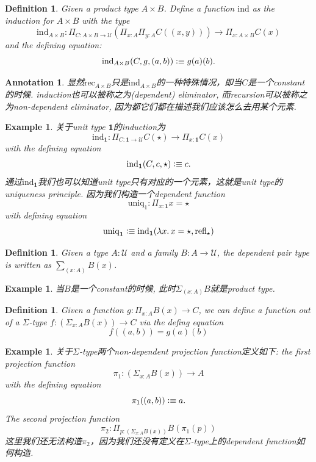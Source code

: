 \documentclass{article}
\newtheorem{example}[theorem]{Example}
\newtheorem{definition}[theorem]{Definition}
\newtheorem{annotation}[theorem]{Annotation}
\newcommand{\lam}[2]{\ensuremath{\lambda #1\ldotp #2}} %
\newcommand{\defeqv}{\vcentcolon\equiv}
\begin{document}
\begin{definition}
\rm Given a product type $A \times B$. Define a function $\text{ind}$ as the induction for $A \times B$ with the type
\[
	\text{ind}_{A \times B}: {\Pi}_{C:A \times B \to \mathcal{U}}(\Pi_{x:A}\Pi_{y:A} C((x,y))) \to \Pi_{x:A\times B} C(x)
\]
and the defining equation:
\[
	\text{ind}_{A \times B}(C, g, (a,b)) \defeqv g(a)(b).
\]
\end{definition}

\begin{annotation}
\rm 显然$\text{rec}_{A \times B}$只是$\text{ind}_{A \times B}$的一种特殊情况，即当$C$是一个constant的时候. induction也可以被称之为(dependent) eliminator, 而recursion可以被称之为non-dependent eliminator, 因为都它们都在描述我们应该怎么去用某个元素. 
\end{annotation}

\begin{example}
\rm 关于unit type $\mathbf{1}$的induction为
\[
    \text{ind}_\mathbf{1}: \Pi_{C:\mathbf{1} \to \mathcal{U}} C(\star) \to \Pi_{x:\mathbf{1}} C(x)
\]
with the defining equation
\[
    \text{ind}_\mathbf{1}(C,c,\star) \defeqv c.
\]
通过$\text{ind}_\mathbf{1}$我们也可以知道unit type只有对应的一个元素，这就是unit type的uniqueness principle. 因为我们构造一个dependent function
\[
    \text{uniq}_1:\Pi_{x:\mathbf{1}} x=\star
\]
with defining equation
\[
    \text{uniq}_\mathbf{1} \defeqv \text{ind}_\mathbf{1}(\lam{x}{x = \star}, \text{refl}_\star)
\]
\end{example}

\begin{definition}
\rm Given a type $A:\mathcal{U}$ and a family $B: A \to \mathcal{U}$, the dependent pair type is written as $\sum_{(x:A)} B(x)$.
\end{definition}

\begin{example}
\rm 当$B$是一个constant的时候, 此时$\Sigma_{(x:A)} B$就是product type.
\end{example}

\begin{definition}
\rm Given a function $g:\Pi_{x:A} B(x) \to C$, we can define a function out of a $\Sigma$-type $f:(\Sigma_{x:A}B(x)) \to C$ via the defing equation
\[
    f((a,b)) = g(a)(b)
\]
\end{definition}

\begin{example}
\rm 关于$\Sigma$-type两个non-dependent projection function定义如下: the first projection function
\[
    \pi_1:(\Sigma_{x:A}B(x)) \to A
\]
with the defining equation
\[
    \pi_1((a,b)) \defeqv a.
\]
The second projection function
\[
    \pi_2:\Pi_{p:(\Sigma_{x:A}B(x))} B(\pi_1(p)) 
\]
这里我们还无法构造$\pi_2$，因为我们还没有定义在$\Sigma$-type上的dependent function如何构造. 
\end{example}
\end{document}
